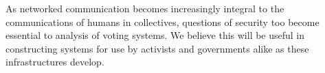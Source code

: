 \documentclass[finalcopy,nolof,nolot]{srpaper}
\begin{document}
As networked communication becomes increasingly integral to the communications
of humans in collectives, questions of security too become essential to analysis
of voting systems.  We believe this will be useful in constructing systems for
use by activists and governments alike as these infrastructures develop.

\listoftodos



% 
\end{document}
